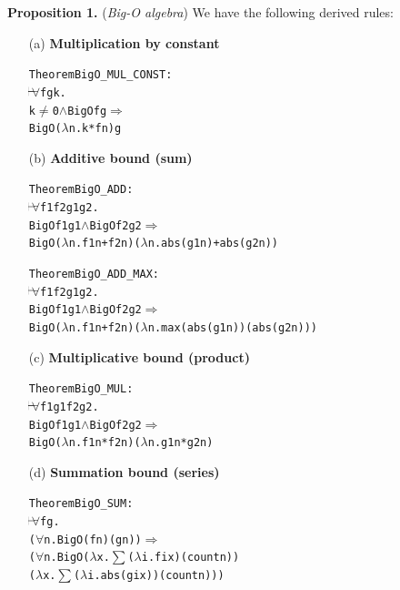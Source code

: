 \textbf{Proposition 1.} (\emph{Big-O algebra}) We have the following derived rules:
\begin{itemize}
  \item[(a)] \textbf{Multiplication by constant}
  \begin{hol}
\begin{alltt}
Theorem BigO\_MUL\_CONST :
\(\!\!\!{\turn}\!\!\!\!\) \(\forall\)f g k.
k \(\ne\) 0 \(\land\) BigO f g \(\Rightarrow\)
BigO (\(\lambda\)n. k * f n) g
\end{alltt}
\end{hol}
  \item[(b)] \textbf{Additive bound (sum)}
  \begin{hol}
\begin{alltt}
Theorem BigO\_ADD :
\(\!\!\!{\turn}\!\!\!\!\) \(\forall\)f1 f2 g1 g2.
BigO f1 g1 \(\land\) BigO f2 g2 \(\Rightarrow\)
BigO (\(\lambda\)n. f1 n + f2 n) (\(\lambda\)n. abs (g1 n) + abs (g2 n))
\end{alltt}
\end{hol}

\begin{hol}
\begin{alltt}
Theorem BigO\_ADD\_MAX :
\(\!\!\!{\turn}\!\!\!\!\) \(\forall\)f1 f2 g1 g2.
BigO f1 g1 \(\land\) BigO f2 g2 \(\Rightarrow\)
BigO (\(\lambda\)n. f1 n + f2 n) (\(\lambda\)n. max (abs (g1 n)) (abs (g2 n)))
\end{alltt}
\end{hol}
  \item[(c)] \textbf{Multiplicative bound (product)}
  \begin{hol}
\begin{alltt}
Theorem BigO\_MUL :
\(\!\!\!{\turn}\!\!\!\!\) \(\forall\)f1 g1 f2 g2.
BigO f1 g1 \(\land\) BigO f2 g2 \(\Rightarrow\)
BigO (\(\lambda\)n. f1 n * f2 n) (\(\lambda\)n. g1 n * g2 n)
\end{alltt}
\end{hol}
  \item[(d)] \textbf{Summation bound (series)}
  \begin{hol}
\begin{alltt}
Theorem BigO\_SUM :
\(\!\!\!{\turn}\!\!\!\!\) \(\forall\)f g.
(\(\forall\)n. BigO (f n) (g n)) \(\Rightarrow\)
(\(\forall\)n. BigO (\(\lambda\)x. \(\sum\) (\(\lambda\)i. f i x) (count n))
               (\(\lambda\)x. \(\sum\) (\(\lambda\)i. abs (g i x)) (count n)))
\end{alltt}
\end{hol}
\end{itemize}


